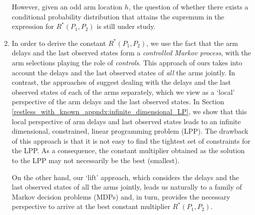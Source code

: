\begin{enumerate}
     However, given an odd arm location $h$, the question of whether there exists a conditional probability distribution that attains the supremum in the expression for $R^*(P_1,P_2)$ is still under study.
	
	\item In order to derive the constant $R^*(P_1,P_2)$, we use the fact that the arm delays and the last observed states form a \emph{controlled Markov process}, with the arm selections playing the role of \emph{controls}. This approach of ours takes into account the delays and the last observed states of \emph{all} the arms jointly. In contrast, the approaches of \cite{Vaidhiyan2017,vaidhiyan2012active, vaidhiyan2017learning, prabhu2017optimal}  suggest dealing with the delays and the last observed states of each of the arms separately, which we view as a `local' perspective of the arm delays and the last observed states. In Section \ref{restless_with_known_appndx:infinite_dimensional_LP}, we show that this local perspective of arm delays and last observed states leads to an infinite dimensional, constrained, linear programming problem (LPP). The drawback of this approach is that it is not easy to find the tightest set of constraints for the LPP. As a consequence, the constant multiplier obtained as the solution to the LPP may not necessarily be the best (smallest). 
	
	On the other hand, our `lift' approach, which considers the delays and the last observed states of all the arms jointly, leads us naturally to a family of Markov decision problems (MDPs) and, in turn, provides the necessary perspective to arrive at the best constant multiplier $R^*(P_1,P_2)$.
	

\end{enumerate}
